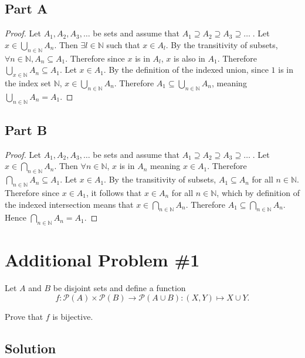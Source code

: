 \documentclass[12pt]{extarticle}
\newcommand{\powerset}[1]{\mathcal{P}(#1)}
\begin{document}
\subsection*{Part A}

\begin{proof}
	Let $A_1, A_2, A_3, \ldots$ be sets and assume that $A_1 \supseteq A_2 \supseteq A_3 \supseteq\ldots\;$. Let $x \in \bigcup_{n \in \mathbb{N}} A_n$. Then $\exists l \in \mathbb{N}$ such that $x \in A_l$. By the transitivity of subsets, $\forall n \in \mathbb{N}, A_n \subseteq A_1$. Therefore since $x$ is in $A_l$, $x$ is also in $A_1$. Therefore $\bigcup_{x \in \mathbb{N}} A_n \subseteq A_1$. Let $x \in A_1$. By the definition of the indexed union, since $1$ is in the index set $\mathbb{N}$, $x \in \bigcup_{n \in \mathbb{N}} A_n$. Therefore $A_1 \subseteq \bigcup_{n \in \mathbb{N}} A_n$, meaning $\bigcup_{n\in \mathbb{N}} A_n = A_1$.
\end{proof}

\subsection*{Part B}

\begin{proof}
	Let $A_1, A_2, A_3, \ldots$ be sets and assume that $A_1 \supseteq A_2 \supseteq A_3 \supseteq\ldots\;$. Let $x \in \bigcap_{n \in \mathbb{N}} A_n$. Then $\forall n \in \mathbb{N}$, $x$ is in $A_n$ meaning $x \in A_1$. Therefore $\bigcap_{n \in \mathbb{N}} A_n \subseteq A_1$. Let $x \in A_1$. By the transitivity of subsets, $A_1 \subseteq A_n$ for all $n \in \mathbb{N}$. Therefore since $x\in A_1$, it follows that $x \in A_n$ for all $n \in \mathbb{N}$, which by definition of the indexed intersection means that $x \in \bigcap_{n \in \mathbb{N}}A_n$. Therefore $A_1 \subseteq \bigcap_{n \in \mathbb{N}}A_n$. Hence $\bigcap_{n \in \mathbb{N}}A_n = A_1$.
\end{proof}


\section*{Additional Problem \#1}

Let $A$ and $B$ be disjoint sets and define a function
\[
	f: \powerset{A} \times \powerset{B} \rightarrow \powerset{A \cup B} : (X, Y) \mapsto X \cup Y
.\]

Prove that $f$ is bijective.

\subsection*{Solution}
\end{document}
